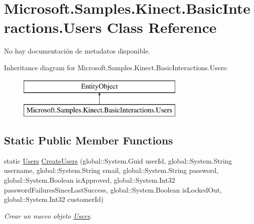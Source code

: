 \hypertarget{class_microsoft_1_1_samples_1_1_kinect_1_1_basic_interactions_1_1_users}{\section{Microsoft.\-Samples.\-Kinect.\-Basic\-Interactions.\-Users Class Reference}
\label{class_microsoft_1_1_samples_1_1_kinect_1_1_basic_interactions_1_1_users}
}


No hay documentación de metadatos disponible.  


Inheritance diagram for Microsoft.\-Samples.\-Kinect.\-Basic\-Interactions.\-Users\-:\begin{figure}[H]
\begin{center}
\leavevmode
\includegraphics[height=2.000000cm]{class_microsoft_1_1_samples_1_1_kinect_1_1_basic_interactions_1_1_users}
\end{center}
\end{figure}
\subsection*{Static Public Member Functions}
\begin{DoxyCompactItemize}
\item 
static \hyperlink{class_microsoft_1_1_samples_1_1_kinect_1_1_basic_interactions_1_1_users}{Users} \hyperlink{class_microsoft_1_1_samples_1_1_kinect_1_1_basic_interactions_1_1_users_afe2b993c16635c16286fd78e432ab6f6}{Create\-Users} (global\-::\-System.\-Guid user\-Id, global\-::\-System.\-String username, global\-::\-System.\-String email, global\-::\-System.\-String password, global\-::\-System.\-Boolean is\-Approved, global\-::\-System.\-Int32 password\-Failures\-Since\-Last\-Success, global\-::\-System.\-Boolean is\-Locked\-Out, global\-::\-System.\-Int32 customer\-Id)
\begin{DoxyCompactList}\small\item\em Crear un nuevo objeto \hyperlink{class_microsoft_1_1_samples_1_1_kinect_1_1_basic_interactions_1_1_users}{Users}. \end{DoxyCompactList}\end{DoxyCompactItemize}
